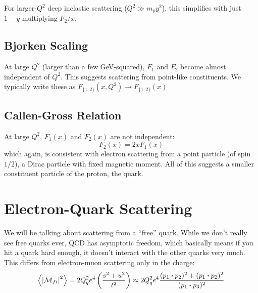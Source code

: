 \documentclass[a4paper,twoside,master.tex]{subfiles}
\begin{document}
For larger-$ Q^2 $ deep inelastic scattering ($ Q^2 \gg m_p y^2 $), this simplifies with just $ 1-y $ multiplying $ F_2/x $.

\subsection{Bjorken Scaling}\label{sub:bjorken_scaling}

At large $ Q^2 $ (larger than a few GeV-squared), $ F_1 $ and $ F_2 $ become almost independent of $ Q^2 $. This suggests scattering from point-like constituents. We typically write these as $ F_{\{1,2\}}(x, Q^2) \to F_{\{1,2\}}(x) $

\subsection{Callen-Gross Relation}\label{sub:callen-gross_relation}

At large $ Q^2 $, $ F_1(x) $ and $ F_2(x) $ are not independent:
\begin{equation}
    F_2(x) = 2x F_1(x)
\end{equation}
which again, is consistent with electron scattering from a point particle (of spin $ 1/2 $), a Dirac particle with fixed magnetic moment. All of this suggests a smaller constituent particle of the proton, the quark.

\section{Electron-Quark Scattering}\label{sec:electron-quark_scattering}

We will be talking about scattering from a ``free'' quark. While we don't really see free quarks ever, QCD has asymptotic freedom, which basically means if you hit a quark hard enough, it doesn't interact with the other quarks very much. This differs from electron-muon scattering only in the charge:
\begin{equation}
    \ev{\abs{\mathcal{M}_{fi}}^2} = 2Q_q^2 e^4 \left( \frac{s^2 + u^2}{t^2} \right) \approx 2Q_q^2 e^4 \frac{(p_1 \vdot p_2)^2 + (p_1 \vdot p_2)^2}{(p_1 \vdot p_3)^2}
\end{equation}
\end{document}
